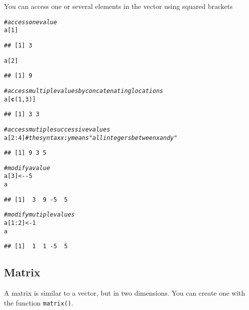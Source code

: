\documentclass[12pt,a4paper]{scrartcl}\usepackage[]{graphicx}\usepackage[]{color}
\makeatletter
\newcommand{\hlnum}[1]{\textcolor[rgb]{0.686,0.059,0.569}{#1}}%
\newcommand{\hlcom}[1]{\textcolor[rgb]{0.678,0.584,0.686}{\textit{#1}}}%
\newcommand{\hlopt}[1]{\textcolor[rgb]{0,0,0}{#1}}%
\newcommand{\hlstd}[1]{\textcolor[rgb]{0.345,0.345,0.345}{#1}}%
\newcommand{\hlkwb}[1]{\textcolor[rgb]{0.69,0.353,0.396}{#1}}%
\newcommand{\hlkwd}[1]{\textcolor[rgb]{0.737,0.353,0.396}{\textbf{#1}}}%
\newenvironment{kframe}{%
 \def\at@end@of@kframe{}%
 \ifinner\ifhmode%
  \def\at@end@of@kframe{\end{minipage}}%
  \begin{minipage}{\columnwidth}%
 \fi\fi%
 \def\FrameCommand##1{\hskip\@totalleftmargin \hskip-\fboxsep
 \colorbox{shadecolor}{##1}\hskip-\fboxsep
     \hskip-\linewidth \hskip-\@totalleftmargin \hskip\columnwidth}%
 \MakeFramed {\advance\hsize-\width
   \@totalleftmargin\z@ \linewidth\hsize
   \@setminipage}}%
 {\par\unskip\endMakeFramed%
 \at@end@of@kframe}
\newenvironment{knitrout}{}{} %
\makeatother
\begin{document}
You can access one or several elements in the vector using squared brackets
\begin{knitrout}
\color{fgcolor}\begin{kframe}
\begin{alltt}
\hlcom{#access one value}
\hlstd{a[}\hlnum{1}\hlstd{]}
\end{alltt}
\begin{verbatim}
## [1] 3
\end{verbatim}
\begin{alltt}
\hlstd{a[}\hlnum{2}\hlstd{]}
\end{alltt}
\begin{verbatim}
## [1] 9
\end{verbatim}
\begin{alltt}
\hlcom{#access multiple values by concatenating locations}
\hlstd{a[}\hlkwd{c}\hlstd{(}\hlnum{1}\hlstd{,}\hlnum{3}\hlstd{)]}
\end{alltt}
\begin{verbatim}
## [1] 3 3
\end{verbatim}
\begin{alltt}
\hlcom{#access mutiple successive values}
\hlstd{a[}\hlnum{2}\hlopt{:}\hlnum{4}\hlstd{]}\hlcom{#the syntax x:y means "all integers between x and y"}
\end{alltt}
\begin{verbatim}
## [1] 9 3 5
\end{verbatim}
\begin{alltt}
\hlcom{#modify a value}
\hlstd{a[}\hlnum{3}\hlstd{]} \hlkwb{<-} \hlopt{-}\hlnum{5}
\hlstd{a}
\end{alltt}
\begin{verbatim}
## [1]  3  9 -5  5
\end{verbatim}
\begin{alltt}
\hlcom{#modify mutiple values}
\hlstd{a[}\hlnum{1}\hlopt{:}\hlnum{2}\hlstd{]} \hlkwb{<-} \hlnum{1}
\hlstd{a}
\end{alltt}
\begin{verbatim}
## [1]  1  1 -5  5
\end{verbatim}
\end{kframe}
\end{knitrout}

\subsection{Matrix}
A matrix is similar to a vector, but in two dimensions.
You can create one with the function \texttt{matrix()}.
\end{document}
